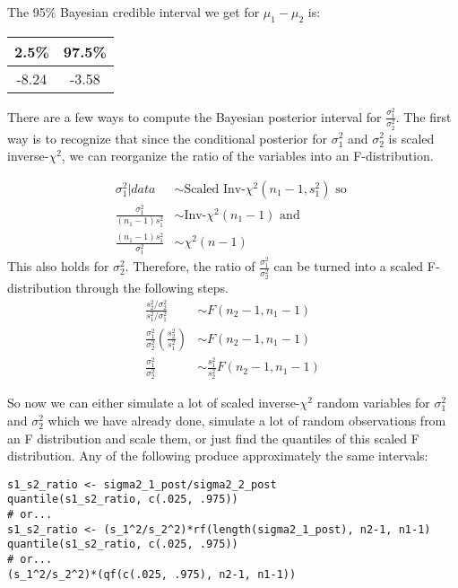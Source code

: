 \documentclass[12pt,a4paper]{article}
\begin{document}
The 95\% Bayesian credible interval we get for $\mu_1 - \mu_2$ is:

\begin{center}
	\begin{tabular}{|| c | c ||}
		2.5\% & 97.5\% \\
		\hline
		-8.24 & -3.58
	\end{tabular}
\end{center}

There are a few ways to compute the Bayesian posterior interval for $\frac{\sigma^2_1}{\sigma^2_2}$.
The first way is to recognize that since the conditional posterior for $\sigma^2_1$ and $\sigma^2_2$ is scaled inverse-$\chi^2$, we can reorganize the ratio of the variables into an F-distribution.

\begin{align*}
	\sigma^2_1 | data &\sim \text{Scaled Inv-}\chi^2(n_1 -1, s^2_1) \text{ so } \\
	\frac{\sigma^2_1}{(n_1 - 1) s_1^2} &\sim \text{Inv-}\chi^2(n_1 - 1) \text{ and } \\
	\frac{(n_1 - 1)s_1^2}{\sigma^2_1} &\sim \chi^2(n-1)
\end{align*}
This also holds for $\sigma^2_2$.
Therefore, the ratio of $\frac{\sigma^2_1}{\sigma^2_2}$ can be turned into a scaled F-distribution through the following steps.
\begin{align*}
	\frac{s_2^2 / \sigma^2_2}{s_1^2 / \sigma^2_1} &\sim F(n_2 - 1, n_1 - 1) \\
	\frac{\sigma^2_1}{\sigma^2_2} \left(\frac{s^2_2}{s^2_1}\right) &\sim F(n_2 - 1, n_1 - 1) \\
	\frac{\sigma^2_1}{\sigma^2_2} &\sim \frac{s_1^2}{s_2^2} F(n_2 - 1, n_1 - 1)
\end{align*}

So now we can either simulate a lot of scaled inverse-$\chi^2$ random variables for $\sigma^2_1$ and $\sigma^2_2$ which we have already done, simulate a lot of random observations from an F distribution and scale them, or just find the quantiles of this scaled F distribution.
Any of the following produce approximately the same intervals:

\begin{lstlisting}
s1_s2_ratio <- sigma2_1_post/sigma2_2_post
quantile(s1_s2_ratio, c(.025, .975))
# or...
s1_s2_ratio <- (s_1^2/s_2^2)*rf(length(sigma2_1_post), n2-1, n1-1)
quantile(s1_s2_ratio, c(.025, .975))
# or...
(s_1^2/s_2^2)*(qf(c(.025, .975), n2-1, n1-1))
\end{lstlisting}
\end{document}
